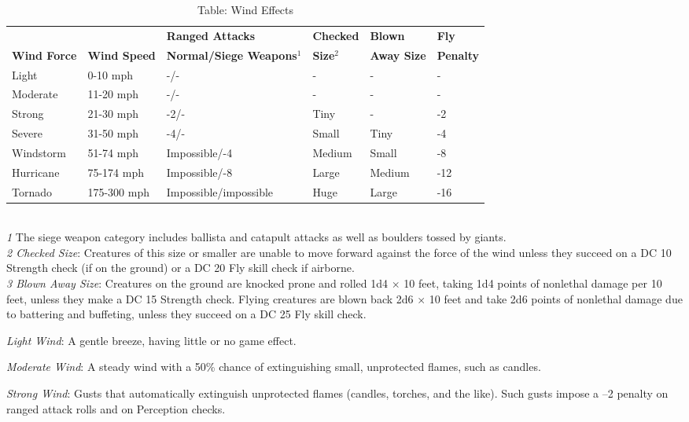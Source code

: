 \begin{table*}[]
\sffamily
\caption{Table: Wind Effects}
\begin{tabular}{llllll}
                    &                     & \textbf{Ranged Attacks} & \textbf{Checked} & \textbf{Blown} & \textbf{Fly}\\
\textbf{Wind Force} & \textbf{Wind Speed} & \textbf{Normal/Siege Weapons\(^{1}\)} & \textbf{Size\(^{2}\)} & \textbf{Away Size} & \textbf{Penalty}\\
Light & 0-10 mph & -/- & - & - & - \\
 Moderate & 11-20 mph & -/- & - & - & - \\
 Strong & 21-30 mph & -2/- & Tiny & - & -2 \\
 Severe & 31-50 mph & -4/- & Small & Tiny & -4 \\
 Windstorm & 51-74 mph & Impossible/-4 & Medium & Small & -8 \\
 Hurricane & 75-174 mph & Impossible/-8 & Large & Medium & -12 \\
 Tornado & 175-300 mph & Impossible/impossible & Huge & Large & -16\\
\end{tabular}\\
\textit{1} The siege weapon category includes ballista and catapult attacks as well as boulders tossed by giants.\\
\textit{2 Checked Size}: Creatures of this size or smaller are unable to move forward against the force of the wind unless they succeed on a DC 10 Strength check (if on the ground) or a DC 20 Fly skill check if airborne.\\
\textit{3 Blown Away Size}: Creatures on the ground are knocked prone and rolled 1d4 \mbox{$\times$} 10 feet, taking 1d4 points of nonlethal damage per 10 feet, unless they make a DC 15 Strength check. Flying creatures are blown back 2d6 \mbox{$\times$} 10 feet and take 2d6 points of nonlethal damage due to battering and buffeting, unless they succeed on a DC 25 Fly skill check.\\
\end{table*}
				
\textit{Light Wind}: A gentle breeze, having little or no game effect.
				
\textit{Moderate Wind}: A steady wind with a 50\% chance of extinguishing small, unprotected flames, such as candles.
				
\textit{Strong Wind}: Gusts that automatically extinguish unprotected flames (candles, torches, and the like). Such gusts impose a --2 penalty on ranged attack rolls and on Perception checks.
				
